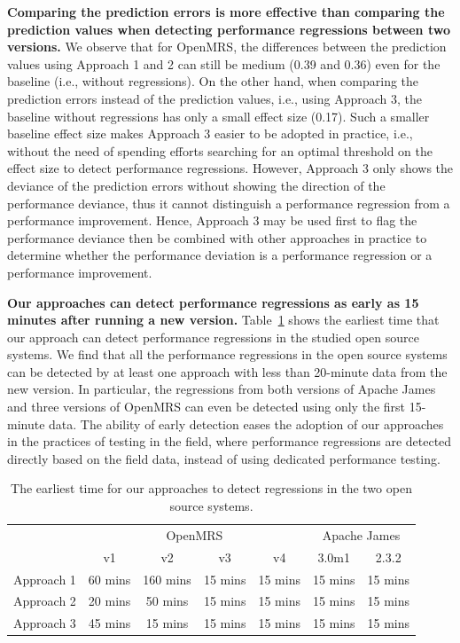\noindent\textbf{Comparing the prediction errors is more effective than comparing the prediction values when detecting performance regressions between two versions.}
We observe that for OpenMRS, the differences between the prediction values using Approach 1 and 2 can still be medium (0.39 and 0.36) even for the baseline (i.e., without regressions).
On the other hand, when comparing the prediction errors instead of the prediction values, i.e., using Approach 3, the baseline without regressions has only a small effect size (0.17).
Such a smaller baseline effect size makes Approach 3 easier to be adopted in practice, i.e., without the need of spending efforts searching for an optimal threshold on the effect size to detect performance regressions. However, Approach 3 only shows the deviance of the prediction errors without showing the direction of the performance deviance, thus it cannot distinguish a performance regression from a performance improvement. Hence, Approach 3 may be used first to flag the performance deviance then be combined with other approaches in practice to determine whether the performance deviation is a performance regression or a performance improvement.


\noindent\textbf{Our approaches can detect performance regressions as early as 15 minutes after running a new version.}
Table~\ref{tab:howearly} shows the earliest time that our approach can detect performance regressions in the studied open source systems. We find that all the performance regressions in the open source systems can be detected by at least one approach with less than 20-minute data from the new version. In particular, the regressions from both versions of Apache James and three versions of OpenMRS can even be detected using only the first 15-minute data. The ability of early detection eases the adoption of our approaches in the practices of testing in the field, where performance regressions are detected directly based on the field data, instead of using dedicated performance testing. 
 
\begin{table}[tbh]
  \centering
  \caption{The earliest time for our approaches to detect regressions in the two open source systems.}
    \begin{tabular}{c|cccc|cc}
    \hline
          & \multicolumn{4}{c|}{OpenMRS}  & \multicolumn{2}{c}{Apache James} \\
\cline{2-7}          & v1    & v2    & v3    & v4    & 3.0m1 & 2.3.2 \\
    \hline
    Approach 1 & 60 mins & 160 mins & 15 mins & 15 mins & 15 mins & 15 mins \\
    Approach 2 & 20 mins & 50 mins & 15 mins & 15 mins & 15 mins & 15 mins \\
    Approach 3 & 45 mins & 15 mins & 15 mins & 15 mins & 15 mins & 15 mins \\
    \hline
    \end{tabular}%
  \label{tab:howearly}%
\end{table}%



